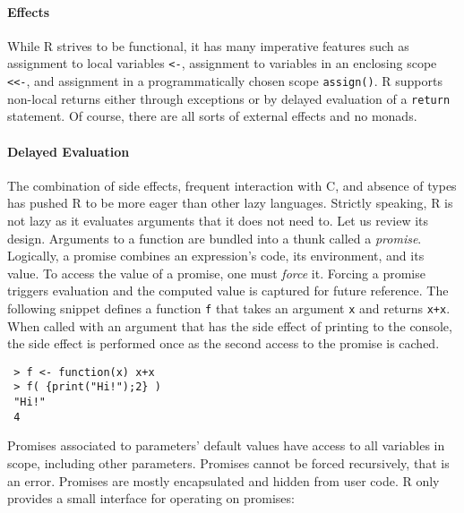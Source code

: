 \documentclass[review,creen,acmsmall]{acmart}
\newcommand{\code}[1]{\lstinline |#1|\xspace}
\begin{document}
\paragraph{Effects} While R strives to be functional, it has many imperative
features such as assignment to local variables \code{<-}, assignment to
variables in an enclosing scope \code{<<-}, and assignment in a programmatically
chosen scope \code{assign()}. R supports non-local returns either through
exceptions or by delayed evaluation of a \code{return} statement. Of course,
there are all sorts of external effects and no monads.

\paragraph{Delayed Evaluation}

The combination of side effects, frequent interaction with C, and absence of
types has pushed R to be more eager than other lazy languages. Strictly
speaking, R is not lazy as it evaluates arguments that it does not need to. Let
us review its design. Arguments to a function are bundled into a thunk called a
\emph{promise}. Logically, a promise combines an expression's code, its
environment, and its value. To access the value of a promise, one must
\emph{force} it. Forcing a promise triggers evaluation and the computed value is
captured for future reference. The following snippet defines a function \code{f}
that takes an argument \code x and returns \code{x+x}. When called with an argument
that has the side effect of printing to the console, the side effect is
performed once as the second access to the promise is cached.
\begin{lstlisting}
 > f <- function(x) x+x
 > f( {print("Hi!");2} )
 "Hi!"
 4
\end{lstlisting}

\noindent
Promises associated to parameters' default values have access to all variables
in scope, including other parameters. Promises cannot be forced recursively,
that is an error. Promises are mostly encapsulated and hidden from user code. R
only provides a small interface for operating on promises:
\end{document}
